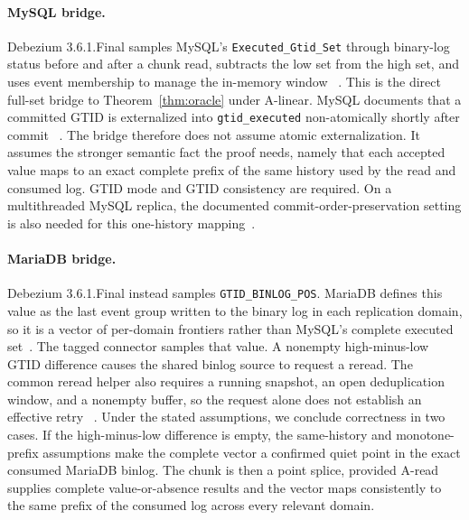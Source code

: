 \documentclass[sigconf,nonacm,10pt]{acmart}
\theoremstyle{plain}
\theoremstyle{definition}
\begin{document}
\paragraph{MySQL bridge.}
Debezium 3.6.1.Final samples MySQL's
\texttt{Executed\_Gtid\_Set} through binary-log status before and
after a chunk read, subtracts the low set from the high set, and uses
event membership to manage the in-memory window
~\cite{debezium_mysql_connector,debezium_mysql_readonly_source}.
This is the direct full-set bridge to Theorem~\ref{thm:oracle} under
A-linear. MySQL documents that a committed GTID is externalized into
\texttt{gtid\_executed} non-atomically shortly after commit
~\cite{mysql_gtid_lifecycle}. The bridge therefore does not assume
atomic externalization. It assumes the stronger semantic fact the
proof needs, namely that each accepted value maps to an exact complete
prefix of the same history used by the read and consumed log. GTID mode
and GTID consistency are required. On a multithreaded MySQL replica,
the documented commit-order-preservation setting is also needed for
this one-history mapping~\cite{debezium_mysql_connector,mysql_gtid_lifecycle}.

\paragraph{MariaDB bridge.}
Debezium 3.6.1.Final instead samples
\texttt{GTID\_\allowbreak{}BINLOG\_\allowbreak{}POS}. MariaDB defines this value as the last
event group written to the binary log in each replication domain, so
it is a vector of per-domain frontiers rather than MySQL's complete
executed set~\cite{mariadb_gtid}. The tagged connector samples that
value. A nonempty high-minus-low GTID difference causes the shared
binlog source to request a reread. The common reread helper also
requires a running snapshot, an open deduplication window, and a
nonempty buffer, so the request alone does not establish an effective
retry
~\cite{debezium_mariadb_readonly_source,debezium_mysql_readonly_source}.
Under the stated assumptions, we conclude correctness in two cases. If the high-minus-low
difference is empty, the same-history and monotone-prefix
assumptions make the complete vector a confirmed quiet point in the exact
consumed MariaDB binlog. The chunk is then a point splice, provided
A-read supplies complete value-or-absence results and the vector
maps consistently to the same prefix of the consumed log across every relevant domain.
\end{document}
